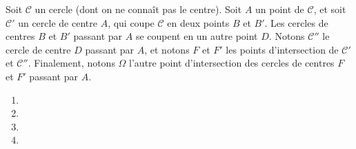 {{Soit \(\mathcal{C}\) un cercle (dont on ne connaît pas le centre). 
Soit \(A\) un point de \(\mathcal{C}\), et soit \(\mathcal{C}'\) 
un cercle de centre \(A\), qui coupe \(\mathcal{C}\) en deux points 
\(B\) et \(B'\). Les cercles de centres \(B\) et \(B'\) passant 
par \(A\) se coupent en un autre point \(D\). Notons \(\mathcal{C}''\) 
le cercle de centre \(D\) passant par \(A\), et notons \(F\) et \(F'\) 
les points d'intersection de \(\mathcal{C}'\) et \(\mathcal{C}''\). 
Finalement, notons \( \Omega\) l'autre point d'intersection des cercles 
de centres \(F\) et \(F'\) passant par \(A\).
}
\begin{enumerate}
    \item {}
    \item {}
    \item {}
    \item {}
\end{enumerate}
}
